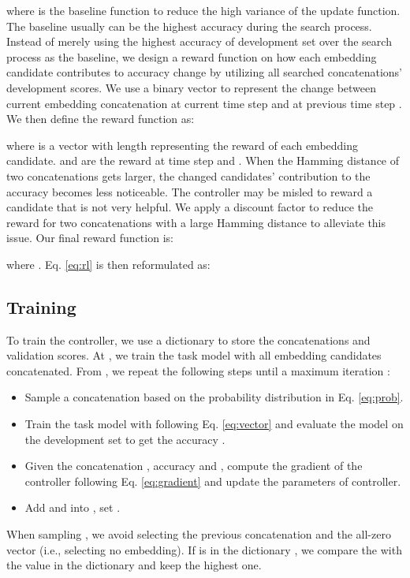 \documentclass{article} \usepackage{iclr2021_conference,times}
\begin{document}
where  is the baseline function to reduce the high variance of the update function. The baseline usually can be the highest accuracy during the search process. 
Instead of merely using the highest accuracy of development set over the search process as the baseline, we design a reward function on how each embedding candidate contributes to accuracy change by utilizing all searched concatenations' development scores.
We use a binary vector  to represent the change between current embedding concatenation  at current time step  and  at previous time step .
We then define the reward function as:

where  is a vector with length  representing the reward of each embedding candidate.  and  are the reward at time step  and . 
When the Hamming distance of two concatenations  gets larger, the changed candidates' contribution to the accuracy becomes less noticeable. The controller may be misled to reward a candidate that is not very helpful.
We apply a discount factor to reduce the reward for two concatenations with a large Hamming distance to alleviate this issue.
Our final reward function is:

where . Eq. \ref{eq:rl} is then reformulated as:
 

\subsection{Training}
To train the controller, we use a dictionary  to store the concatenations and validation scores. At , we train the task model with all embedding candidates concatenated. From , we repeat the following steps until a maximum iteration :
\begin{itemize}
    \item Sample a concatenation  based on the probability distribution in Eq. \ref{eq:prob}.
    \item Train the task model with  following Eq. \ref{eq:vector} and evaluate the model on the development set to get the accuracy .
    \item Given the concatenation , accuracy  and , compute the gradient of the controller following Eq. \ref{eq:gradient} and update the parameters of controller.
    \item Add  and  into , set .
\end{itemize}
When sampling , we avoid selecting the previous concatenation  and the all-zero vector (i.e., selecting no embedding). If  is in the dictionary , we compare the  with the value in the dictionary and keep the highest one.
\end{document}
